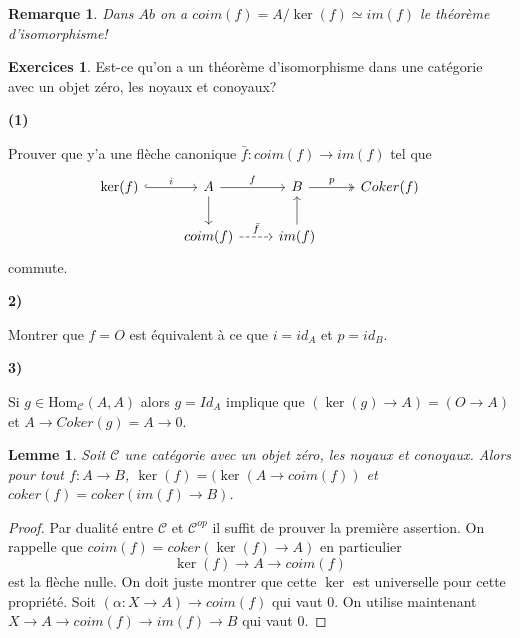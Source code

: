 \documentclass[a4paper,12pt]{book}
\newcommand{\Cat}{\mathcal{C}}
\newcommand{\Hom}{\textrm{Hom}}
\theoremstyle{plain}
\newtheorem{lem}[subsection]{Lemme}
\newtheorem{rem}{Remarque}
\theoremstyle{definition}
\newtheorem{exo}[subsection]{Exercices}
\theoremstyle{remark}
\begin{document}
\begin{rem}
    Dans $Ab$ on a $coim(f)=A/\ker(f)\simeq im(f)$ le théorème 
    d'isomorphisme!
\end{rem}
\begin{exo}
    Est-ce qu'on a un théorème d'isomorphisme dans une catégorie
    avec un objet zéro, les noyaux et conoyaux? 
    \begin{center} \textbf{(1)}    \end{center}	
    Prouver que y'a une flèche canonique 
    $\bar f\colon coim(f)\to im(f)$ tel que 
\[\begin{tikzcd}
	{\ker(f)} & A & B & {Coker(f)} \\
	& {coim(f)} & {im(f)}
	\arrow["i", hook, from=1-1, to=1-2]
	\arrow["f", from=1-2, to=1-3]
	\arrow[from=1-2, to=2-2]
	\arrow["p", two heads, from=1-3, to=1-4]
	\arrow["{\bar f}", dashed, from=2-2, to=2-3]
	\arrow[from=2-3, to=1-3]
\end{tikzcd}\]
    commute.
    \begin{center}\textbf{2)}\end{center}
    Montrer que $f=O$ est équivalent à ce que $i=id_A$ et $p=id_B$.
    \begin{center}\textbf{3)}\end{center}
    Si $g\in \Hom_{\Cat}(A,A)$ alors $g=Id_A$ implique que 
    $(\ker(g)\to A)=(O\to A)$ et $A\to Coker(g)=A\to 0$.
\end{exo}
\begin{lem}
    Soit $\Cat$ une catégorie avec un objet zéro, les noyaux et
    conoyaux. Alors pour tout $f\colon A\to B$, 
    $\ker(f)=(\ker(A\to coim(f))$ et $coker(f)=coker(im(f)\to B)$.
\end{lem}
\begin{proof}
    Par dualité entre $\Cat$ et $\Cat^{op}$ il suffit de prouver la 
    première assertion. On rappelle que $coim(f)=coker(\ker(f)\to A)$
    en particulier
    \[\ker(f)\to A\to coim(f)\]
    est la flèche nulle. On doit juste montrer que cette $\ker$ est
    universelle pour cette propriété. Soit 
    $(\alpha\colon X\to A)\to coim(f)$ qui vaut $0$. On utilise 
    maintenant $X\to A\to coim(f)\to im(f)\to B$ qui vaut $0$.
\end{proof}
\end{document}
